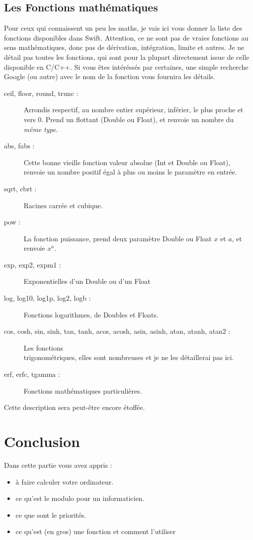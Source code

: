 \subsection{Les Fonctions mathématiques}

Pour ceux qui connaissent un peu les maths, je vais ici vous donner la liste des fonctions disponibles dans Swift. Attention, ce ne sont pas de vraies fonctions au sens mathématiques, donc pas de dérivation, intégration, limite et autres.
Je ne détail pas toutes les fonctions, qui sont pour la plupart directement issue de celle disponible en C/C++.
Si vous êtes intéréssés par certaines, une simple recherche Google (ou autre) avec le nom de la fonction vous fournira les détails.
\begin{description}
\item[ceil, floor, round, trunc :]
Arrondis respectif, au nombre entier supérieur, inférier, le plus proche et vers 0. Prend un flottant (Double ou Float), et renvoie un nombre du \emph{même type}.
\item[abs, fabs :]
Cette bonne vieille fonction valeur absolue (Int et Double ou Float), renvoie un nombre positif égal à plus ou moins le paramètre en entrée.
\item[sqrt, cbrt :]
Racines carrée et cubique.
\item[pow :]
La fonction puissance, prend deux paramètre Double ou Float $x$ et $a$, et renvoie $x^{a}$. %
\item[exp, exp2, expm1 :]
Exponentielles d'un Double ou d'un Float
\item[log, log10, log1p, log2, logb :]
Fonctions logarithmes, de Doubles et Floats.
\item[cos, cosh, sin, sinh, tan, tanh, acos, acosh, asin, asinh, atan, atanh, atan2 :]
Les fonctions\\
trigonométriques, elles sont nombreuses et je ne les détaillerai pas ici.
\item[erf, erfc, tgamma :]
Fonctions mathématiques particulières.
\end{description}
Cette description sera peut-être encore étoffée.
\section*{Conclusion}
{}
Dans cette partie vous avez appris :
\begin{itemize}
\item à faire calculer votre ordinateur.
\item ce qu'est le modulo pour un informaticien.
\item ce que sont le priorités.
\item ce qu'est (en gros) une fonction et comment l'utiliser
\end{itemize}
